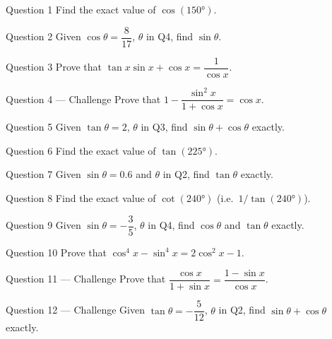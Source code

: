 \documentclass[11pt]{article}
\begin{document}
\begin{qbox}{Question 1}
Find the exact value of $\cos(150°)$.\workspace{2.4cm}
\end{qbox}

\begin{qbox}{Question 2}
Given $\cos\theta=\dfrac{8}{17}$, $\theta$ in Q4, find $\sin\theta$.\workspace{2.4cm}
\end{qbox}

\begin{qbox}{Question 3}
Prove that $\tan x\sin x+\cos x=\dfrac{1}{\cos x}$.\workspace{2.4cm}
\end{qbox}

\begin{qbox}{Question 4 --- Challenge}
Prove that $1-\dfrac{\sin^2x}{1+\cos x}=\cos x$.\workspace{3.2cm}
\end{qbox}

\begin{qbox}{Question 5}
Given $\tan\theta=2$, $\theta$ in Q3, find $\sin\theta+\cos\theta$ exactly.\workspace{2.4cm}
\end{qbox}

\begin{qbox}{Question 6}
Find the exact value of $\tan(225°)$.\workspace{2.4cm}
\end{qbox}

\begin{qbox}{Question 7}
Given $\sin\theta=0.6$ and $\theta$ in Q2, find $\tan\theta$ exactly.\workspace{2.4cm}
\end{qbox}

\begin{qbox}{Question 8}
Find the exact value of $\cot(240°)$ (i.e.\ $1/\tan(240°)$).\workspace{2.4cm}
\end{qbox}

\begin{qbox}{Question 9}
Given $\sin\theta=-\dfrac35$, $\theta$ in Q4, find $\cos\theta$ and $\tan\theta$ exactly.\workspace{2.4cm}
\end{qbox}

\begin{qbox}{Question 10}
Prove that $\cos^4x-\sin^4x=2\cos^2x-1$.\workspace{2.4cm}
\end{qbox}

\begin{qbox}{Question 11 --- Challenge}
Prove that $\dfrac{\cos x}{1+\sin x}=\dfrac{1-\sin x}{\cos x}$.\workspace{3.2cm}
\end{qbox}

\begin{qbox}{Question 12 --- Challenge}
Given $\tan\theta=-\dfrac{5}{12}$, $\theta$ in Q2, find $\sin\theta+\cos\theta$ exactly.\workspace{3.2cm}
\end{qbox}
\end{document}
